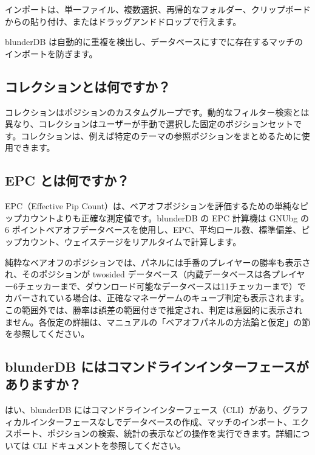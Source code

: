 \documentclass[letterpaper,10pt,dvipdfmx]{sphinxmanual}
\begin{document}
\sphinxAtStartPar
インポートは、単一ファイル、複数選択、再帰的なフォルダー、クリップボードからの貼り付け、またはドラッグアンドドロップで行えます。

\sphinxAtStartPar
blunderDB は自動的に重複を検出し、データベースにすでに存在するマッチのインポートを防ぎます。


\subsection{コレクションとは何ですか？}
\label{\detokenize{faq:qu-est-ce-qu-une-collection}}
\sphinxAtStartPar
コレクションはポジションのカスタムグループです。動的なフィルター検索とは異なり、コレクションはユーザーが手動で選択した固定のポジションセットです。コレクションは、例えば特定のテーマの参照ポジションをまとめるために使用できます。


\subsection{EPC とは何ですか？}
\label{\detokenize{faq:qu-est-ce-que-l-epc}}
\sphinxAtStartPar
EPC（Effective Pip Count）は、ベアオフポジションを評価するための単純なピップカウントよりも正確な測定値です。blunderDB の EPC 計算機は GNUbg の 6 ポイントベアオフデータベースを使用し、EPC、平均ロール数、標準偏差、ピップカウント、ウェイステージをリアルタイムで計算します。

\sphinxAtStartPar
純粋なベアオフのポジションでは、パネルには手番のプレイヤーの勝率も表示され、そのポジションが two\sphinxhyphen{}sided データベース（内蔵データベースは各プレイヤー6チェッカーまで、ダウンロード可能なデータベースは11チェッカーまで）でカバーされている場合は、正確なマネーゲームのキューブ判定も表示されます。この範囲外では、勝率は誤差の範囲付きで推定され、判定は意図的に表示されません。各仮定の詳細は、マニュアルの「ベアオフパネルの方法論と仮定」の節を参照してください。


\subsection{blunderDB にはコマンドラインインターフェースがありますか？}
\label{\detokenize{faq:blunderdb-dispose-t-il-d-une-interface-en-ligne-de-commande}}
\sphinxAtStartPar
はい、blunderDB にはコマンドラインインターフェース（CLI）があり、グラフィカルインターフェースなしでデータベースの作成、マッチのインポート、エクスポート、ポジションの検索、統計の表示などの操作を実行できます。詳細については CLI ドキュメントを参照してください。
\end{document}
